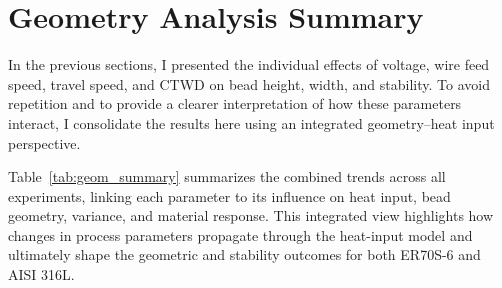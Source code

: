 \documentclass[conference]{IEEEtran}
\begin{document}
\section{Geometry Analysis Summary}

In the previous sections, I presented the individual effects of voltage, wire feed speed, travel speed, and CTWD on bead height, width, and stability. 
To avoid repetition and to provide a clearer interpretation of how these parameters interact, I consolidate the results here using an integrated geometry–heat input perspective.

Table~\ref{tab:geom_summary} summarizes the combined trends across all experiments, linking each parameter to its influence on heat input, bead geometry, variance, and material response. 
This integrated view highlights how changes in process parameters propagate through the heat-input model and ultimately shape the geometric and stability outcomes for both ER70S-6 and AISI 316L.

\begin{table}[t]
\centering
\caption{Integrated summary of parameter interactions with heat input, bead geometry, variance, and material-dependent response.}
\label{tab:geom_summary}


\end{table}
\end{document}
